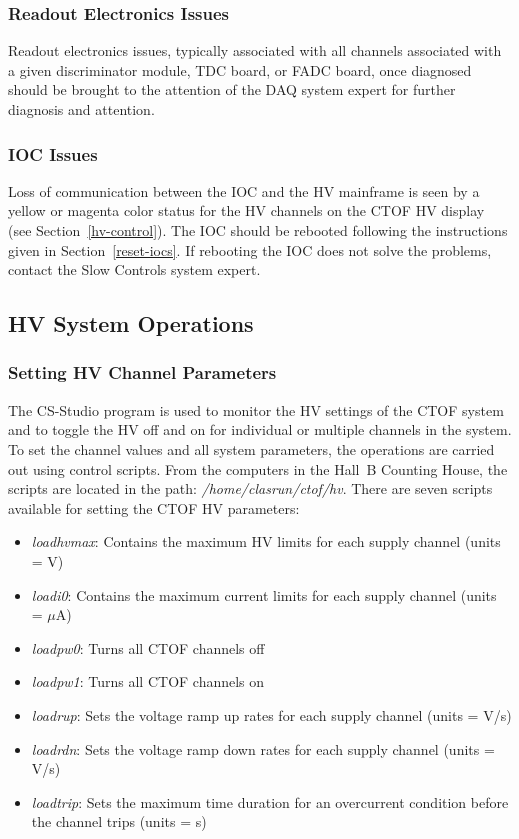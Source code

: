 \documentclass[12pt]{article}
\begin{document}
\subsubsection{Readout Electronics Issues}
\label{readout-issues}

Readout electronics issues, typically associated with all channels associated with 
a given discriminator module, TDC board, or FADC board, once diagnosed should be 
brought to the attention of the DAQ system expert for further diagnosis and attention.

\subsubsection{IOC Issues}
\label{ioc-issues}

Loss of communication between the IOC and the HV mainframe is seen by a yellow or
magenta color status for the HV channels on the CTOF HV display (see 
Section~\ref{hv-control}). The IOC should be rebooted following the instructions 
given in Section~\ref{reset-iocs}. If rebooting the IOC does not solve the problems, 
contact the Slow Controls system expert.

\subsection{HV System Operations}

\subsubsection{Setting HV Channel Parameters}
\label{hv-parms}

The CS-Studio program is used to monitor the HV settings of the CTOF system and 
to toggle the HV off and on for individual or multiple channels in the system. 
To set the channel values and all system parameters, the operations are carried 
out using control scripts. From the computers in the Hall~B Counting House, the 
scripts are located in the path: {\it /home/clasrun/ctof/hv}. There are seven 
scripts available for setting the CTOF HV parameters:

\begin{itemize}
\item {\it loadhvmax}: Contains the maximum HV limits for each supply channel 
(units = V)
\item {\it loadi0}: Contains the maximum current limits for each supply channel 
(units = $\mu$A)
\item {\it loadpw0}: Turns all CTOF channels off
\item {\it loadpw1}: Turns all CTOF channels on
\item {\it loadrup}: Sets the voltage ramp up rates for each supply channel (units 
= V/s)
\item {\it loadrdn}: Sets the voltage ramp down rates for each supply channel 
(units = V/s)
\item {\it loadtrip}: Sets the maximum time duration for an overcurrent condition 
before the 
channel trips (units = s)
\end{itemize}
\end{document}
